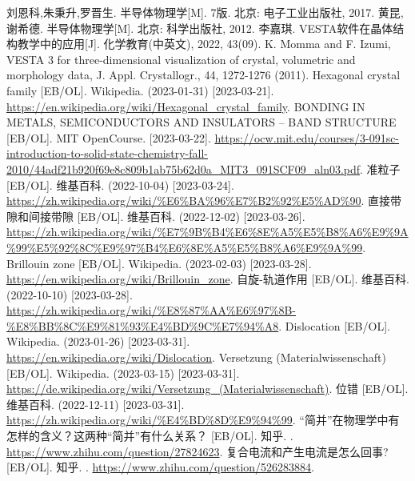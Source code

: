 \begin{thebibliography}{99}%
     刘恩科,朱秉升,罗晋生. 半导体物理学[M]. 7版. 北京: 电子工业出版社, 2017.
     黄昆,谢希德. 半导体物理学[M]. 北京: 科学出版社, 2012.
     李嘉琪. VESTA软件在晶体结构教学中的应用[J]. 化学教育(中英文), 2022, 43(09).
     K. Momma and F. Izumi, VESTA 3 for three-dimensional visualization of crystal, volumetric and morphology data, J. Appl. Crystallogr., 44, 1272-1276 (2011).
     Hexagonal crystal family [EB/OL]. Wikipedia. (2023-01-31) [2023-03-21].\\ \url{https://en.wikipedia.org/wiki/Hexagonal_crystal_family}.
     BONDING IN METALS, SEMICONDUCTORS AND
    INSULATORS – BAND STRUCTURE [EB/OL]. MIT OpenCourse. [2023-03-22]. \url{https://ocw.mit.edu/courses/3-091sc-introduction-to-solid-state-chemistry-fall-2010/44adf21b920f69e8c809b1ab75b62d0a_MIT3_091SCF09_aln03.pdf}.
     准粒子 [EB/OL]. 维基百科. (2022-10-04) [2023-03-24].\\ \url{https://zh.wikipedia.org/wiki/%E6%BA%96%E7%B2%92%E5%AD%90}.
     直接带隙和间接带隙 [EB/OL]. 维基百科. (2022-12-02) [2023-03-26].\\ \url{https://zh.wikipedia.org/wiki/%E7%9B%B4%E6%8E%A5%E5%B8%A6%E9%9A%99%E5%92%8C%E9%97%B4%E6%8E%A5%E5%B8%A6%E9%9A%99}.
     Brillouin zone [EB/OL]. Wikipedia. (2023-02-03) [2023-03-28].\\ \url{https://en.wikipedia.org/wiki/Brillouin_zone}.
     自旋-轨道作用 [EB/OL]. 维基百科. (2022-10-10) [2023-03-28].\\ \url{https://zh.wikipedia.org/wiki/%E8%87%AA%E6%97%8B-%E8%BB%8C%E9%81%93%E4%BD%9C%E7%94%A8}.
     Dislocation [EB/OL]. Wikipedia. (2023-01-26) [2023-03-31].\\ \url{https://en.wikipedia.org/wiki/Dislocation}.
     Versetzung (Materialwissenschaft) [EB/OL]. Wikipedia. (2023-03-15) [2023-03-31].\\ \url{https://de.wikipedia.org/wiki/Versetzung_(Materialwissenschaft)}.
     位错 [EB/OL]. 维基百科. (2022-12-11) [2023-03-31].\\ \url{https://zh.wikipedia.org/wiki/%E4%BD%8D%E9%94%99}.
     “简并”在物理学中有怎样的含义？这两种“简并”有什么关系？ [EB/OL]. 知乎. \newline [2023-04-04]. \url{https://www.zhihu.com/question/27824623}.
     复合电流和产生电流是怎么回事? [EB/OL]. 知乎. \newline [2023-06-01]. \url{https://www.zhihu.com/question/526283884}.
\end{thebibliography}
